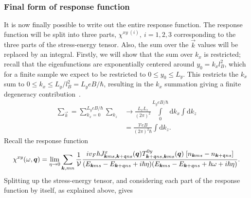 \subsubsection{Final form of response function}
It is now finally possible to write out the entire response function.
The response function will be split into three parts, $\chi ^{xy\; (i)},\: i = 1,2,3$ corresponding to the three parts of the stress-energy tensor.
Also, the sum over the $\vec{k}$ values will be replaced by an integral.
Firstly, we will show that the sum over $k_x$ is restricted;
recall that the eigenfunctions are exponentially centered around $y_0 = k_x l_B^2$, which for a finite sample we expect to be restricted to $0 \leq y_0 \leq L_y$.
This restricts the $k_x$ sum to $0 \leq k_x \leq L_y / l_B^2 = L_ye B /\hbar $, resulting in the $k_x$ summation giving a finite degeneracy contribution~\cites[Ch.~1.4.1]{tongGaugeTheoryLecture}{linderIntermediateQuantumMechanics2017}.
\begin{align}
  \sum\limits_{\vec{k}}^{} = \sum\limits_{k_x = 0}^{L_y eB / \hbar } \sum\limits_{k_z}^{} &\to 
                                                                                            \frac{L_xL_z}{(2\pi )^2} \int\limits_0^{L_y e B /\hbar } \mathrm{d}k_x \int\mathrm{d}k_z \\
  &= \frac{\mathcal{V} e B}{(2 \pi)^2 \hbar } \int \mathrm{d}k_{z}.
\end{align}
Recall the response function
\begin{equation}
  \chi ^{xy} (\omega , \bm{q}) =
  \lim_{\eta \to 0}
  \sum\limits_{\bm{k}, mn}^{}
  \frac{1}{\mathcal{V}}
  \frac{
    i v_F \hbar J^x_{\bm{k} m s, \bm{k}+\mathfrak{q} n s}(\bm{q})
    T^{0y}_{\bm{k}+\mathfrak{q} ns, \bm{k}ms}(\bm{q})
    \;
    [n_{\bm{k} m s}- n_{\bm{k}+\mathfrak{q} ns }]
  }{
    (E_{\bm{k} m s} - E_{\bm{k} + \mathfrak{q} ns} + i \hbar  \eta )
    (E_{\bm{k} m s} - E_{\bm{k} + \mathfrak{q} ns} + \hbar \omega + i \hbar  \eta )
  }
  .
\end{equation}
Splitting up the stress-energy tensor, and considering each part of the response function by itself, as explained above, gives

